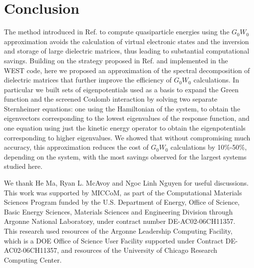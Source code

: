 \documentclass[aip,preprint]{revtex4-1}
\begin{document}
\section{Conclusion\label{sec:conclusion}}
The method introduced in Ref.  to compute quasiparticle energies using the $G_0W_0$ approximation avoids the calculation of virtual electronic states and the inversion and storage of large dielectric matrices, thus leading to substantial computational savings. Building on the strategy proposed in Ref. \cite{wilson2008,wilson2009} and implemented in the WEST code,\cite{Marco2015} here we proposed an approximation of the spectral decomposition of dielectric matrices that further improve the efficiency of $G_0W_0$ calculations. In particular we built sets of eigenpotentials used as a basis to expand the Green function and the screened Coulomb interaction by solving two separate Sternheimer equations: one using the Hamiltonian of the system, to obtain the eigenvectors corresponding to the lowest eigenvalues of the response function,  and one equation using just the kinetic energy operator to obtain the eigenpotentials corresponding to higher eigenvalues.  We showed that without compromising much accuracy, this approximation reduces the cost of $G_0W_0$ calculations by 10\%-50\%, depending on the system, with the most savings observed for the largest systems studied here.
    
\begin{acknowledgments}
We thank He Ma, Ryan L. McAvoy and Ngoc Linh Nguyen for useful discussions. This work was supported by MICCoM, as part of the
Computational Materials Sciences Program funded by the U.S.
Department of Energy, Office of Science, Basic Energy
Sciences, Materials Sciences and Engineering Division through
Argonne National Laboratory, under contract number DE-AC02-06CH11357. This research used resources of the Argonne Leadership Computing Facility, which is a DOE Office of Science User Facility supported under Contract DE-AC02-06CH11357, and resources of the University of Chicago Research Computing Center.


\end{acknowledgments}

\clearpage

\end{document}
